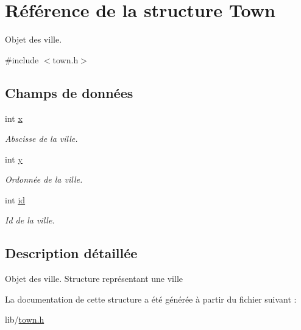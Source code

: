 \hypertarget{structTown}{
\section{Référence de la structure Town}
\label{structTown}
}


Objet des ville.  




{\ttfamily \#include $<$town.h$>$}

\subsection*{Champs de données}
\begin{DoxyCompactItemize}
\item 
\hypertarget{structTown_a94ac9f23445b2bc5d3f148b9ae044c04}{
int \hyperlink{structTown_a94ac9f23445b2bc5d3f148b9ae044c04}{x}}
\label{structTown_a94ac9f23445b2bc5d3f148b9ae044c04}

\begin{DoxyCompactList}\small\item\em Abscisse de la ville. \item\end{DoxyCompactList}\item 
\hypertarget{structTown_ad0221f06d5fafb6e677034f3e95f23f2}{
int \hyperlink{structTown_ad0221f06d5fafb6e677034f3e95f23f2}{y}}
\label{structTown_ad0221f06d5fafb6e677034f3e95f23f2}

\begin{DoxyCompactList}\small\item\em Ordonnée de la ville. \item\end{DoxyCompactList}\item 
\hypertarget{structTown_a3fd25ddbb4f43f39fb8ccd507c8b8b2b}{
int \hyperlink{structTown_a3fd25ddbb4f43f39fb8ccd507c8b8b2b}{id}}
\label{structTown_a3fd25ddbb4f43f39fb8ccd507c8b8b2b}

\begin{DoxyCompactList}\small\item\em Id de la ville. \item\end{DoxyCompactList}\end{DoxyCompactItemize}


\subsection{Description détaillée}
Objet des ville. Structure représentant une ville 

La documentation de cette structure a été générée à partir du fichier suivant :\begin{DoxyCompactItemize}
\item 
lib/\hyperlink{town_8h}{town.h}\end{DoxyCompactItemize}
